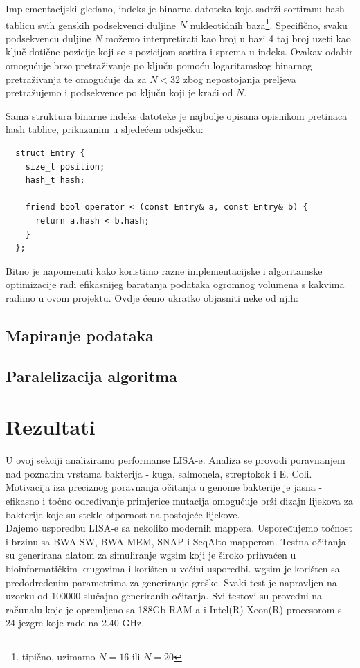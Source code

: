 \documentclass[times, utf8, diplomski]{fer}
\begin{document}
Implementacijski gledano, indeks je binarna datoteka koja sadrži sortiranu hash tablicu svih genskih podsekvenci
duljine $N$ nukleotidnih baza\footnote{tipično, uzimamo $N = 16$ ili $N = 20$}. Specifično, svaku podsekvencu
duljine $N$ možemo interpretirati kao broj u bazi 4 taj broj uzeti kao ključ dotične pozicije koji se s pozicijom
sortira i sprema u indeks. Ovakav odabir omogućuje brzo pretraživanje po ključu pomoću logaritamskog binarnog 
pretraživanja te omogućuje da za $N < 32$ zbog nepostojanja preljeva pretražujemo i podsekvence po ključu koji
je kraći od $N$.

Sama struktura binarne indeks datoteke je najbolje opisana opisnikom pretinaca hash tablice, prikazanim u sljedećem
odsječku:

\begin{lstlisting}
  struct Entry {
    size_t position;
    hash_t hash;

    friend bool operator < (const Entry& a, const Entry& b) {
      return a.hash < b.hash;
    }
  };
\end{lstlisting}

Bitno je napomenuti kako koristimo razne implementacijske i algoritamske optimizacije radi efikasnijeg
baratanja podataka ogromnog volumena s kakvima radimo u ovom projektu. Ovdje ćemo ukratko objasniti neke od njih:

\begin{itemize}
\end{itemize}

\section{Mapiranje podataka}
\section{Paralelizacija algoritma}

\chapter{Rezultati}
U ovoj sekciji analiziramo performanse LISA-e. Analiza se provodi poravnanjem nad poznatim vrstama bakterija - kuga, salmonela, streptokok i E. Coli. Motivacija iza preciznog poravnanja očitanja u genome bakterije je jasna - efikasno i točno određivanje primjerice mutacija omogućuje brži dizajn lijekova za bakterije koje su stekle otpornost na postojeće lijekove.\\
Dajemo usporedbu LISA-e sa nekoliko modernih mappera. Uspoređujemo točnost i brzinu sa BWA-SW, BWA-MEM, SNAP i SeqAlto mapperom. Testna očitanja su generirana alatom za simuliranje wgsim koji je široko prihvaćen u bioinformatičkim krugovima i korišten u većini usporedbi. wgsim je korišten sa predodređenim parametrima za generiranje greške. Svaki test je napravljen na uzorku od 100000 slučajno generiranih očitanja.
Svi testovi su provedni na računalu koje je opremljeno sa 188Gb RAM-a i Intel(R) Xeon(R) procesorom s 24 jezgre koje rade na 2.40 GHz. 
\end{document}
